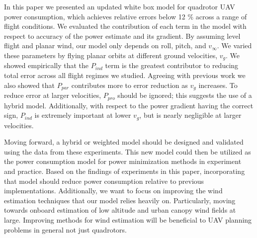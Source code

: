 
In this paper we presented an updated white box model for quadrotor UAV power consumption, which achieves relative errors below 12 $\%$ across a range of flight conditions. We evaluated the contribution of each term in the model with respect to accuracy of the power estimate and its gradient. By assuming level flight and planar wind, our model only depends on roll, pitch, and $v_\infty$. We varied these parameters by flying planar orbits at different ground velocities, $v_g$. We showed empirically that the $P_{ind}$ term is the greatest contributor to reducing total error across all flight regimes we studied. Agreeing with previous work we also showed that $P_{par}$ contributes more to error reduction as $v_g$ increases. To reduce error at larger velocities, $P_{pro}$ should be ignored; this suggests the use of a hybrid model. Additionally, with respect to the power gradient having the correct sign, $P_{ind}$ is extremely important at lower $v_g$, but is nearly negligible at larger velocities. 

Moving forward, a hybrid or weighted model should be designed and validated using the data from these experiments. This new model could then be utilized as the power consumption model for power minimization methods in experiment and practice. Based on the findings of experiments in this paper, incorporating that model should reduce power consumption relative to previous implementations. Additionally, we want to focus on improving the wind estimation techniques that our model relies heavily on. Particularly, moving towards onboard estimation of low altitude and urban canopy wind fields at large. Improving methods for wind estimation will be beneficial to UAV planning problems in general not just quadrotors.
